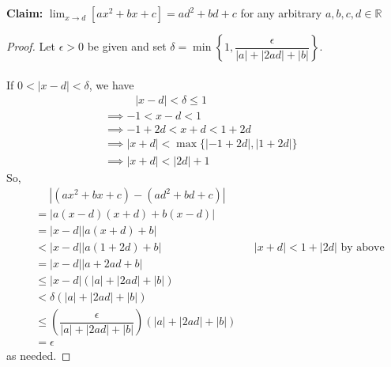\documentclass{article}
\begin{document}
\section*{}
\textbf{Claim:} \(\lim_{x \to d} [ax^2 + bx + c] = ad^2 + bd + c\) for any arbitrary \(a, b, c, d \in \mathbb{R}\)
\begin{proof}
    Let \(\epsilon > 0\) be given and set \(\delta = \min\left\{ 1, \dfrac{\epsilon}{|a| + |2ad| + |b|} \right\}\). \\ \\
    If \(0 < |x - d| < \delta\), we have \begin{align*}
        & \; \; \; \; \; \; \; \; \;\;|x - d| < \delta \leq 1 &&  \\
        &\implies -1 < x - d < 1 \\
        &\implies -1 + 2d < x + d < 1 + 2d \\
        &\implies |x + d| < \max\{|-1+2d|, |1+2d|\}\\
        &\implies |x + d| < |2d| + 1
    \end{align*} So, \begin{align*}
        & \; \; \; \; \, |(ax^2 + bx + c) - (ad^2 + bd + c)| \\
        &= |a(x - d)(x + d) + b(x - d)| \\
        &= |x - d||a(x + d) + b| \\
        &< |x - d||a(1 + 2d) + b| && \text{\(|x + d| < 1 + |2d|\) by above}\\
        &= |x - d||a + 2ad + b| \\
        &\leq |x - d|(|a| + |2ad| + |b|) \\
        &< \delta (|a| + |2ad| + |b|) \\
        &\leq \left(\dfrac{\epsilon}{|a| + |2ad| + |b|}\right)(|a| + |2ad| + |b|) \\
        &= \epsilon
    \end{align*} as needed.
\end{proof}
\end{document}
